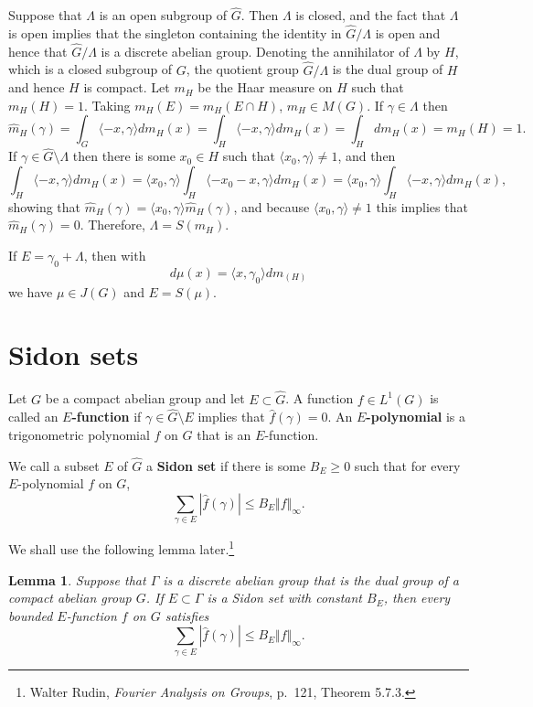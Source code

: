 \documentclass{article}
\newcommand{\inner}[2]{\langle #1, #2 \rangle}
\newcommand{\norm}[1]{\Vert #1 \Vert}
\newtheorem{lemma}[theorem]{Lemma}
\begin{document}
Suppose that $\Lambda$ is an open subgroup of $\widehat{G}$. Then $\Lambda$ is closed,  and
the fact that $\Lambda$ is open implies that the singleton containing the identity in $\widehat{G}/\Lambda$ is open and hence that
$\widehat{G}/\Lambda$ is a discrete abelian group. 
Denoting the annihilator of $\Lambda$ by $H$, which is a closed subgroup of $G$, 
the quotient group $\widehat{G}/\Lambda$ is the dual group of $H$ and hence $H$ is compact. 
Let $m_H$ be the Haar measure on $H$ such that $m_H(H)=1$. Taking $m_H(E) = m_H(E \cap H)$, $m_H \in M(G)$.
 If $\gamma \in \Lambda$ then
\[
\hat{m}_H(\gamma) = \int_G \inner{-x}{\gamma} dm_H(x) = \int_H \inner{-x}{\gamma} dm_H(x) = \int_H dm_H(x) = m_H(H)=1.
\]
If $\gamma \in \widehat{G} \setminus \Lambda$ then there is some $x_0 \in H$ such that $\inner{x_0}{\gamma} \neq 1$,
and then
\[
\int_H \inner{-x}{\gamma} dm_H(x) = \inner{x_0}{\gamma} \int_H \inner{-x_0-x}{\gamma} dm_H(x) = \inner{x_0}{\gamma} \int_H \inner{-x}{\gamma} dm_H(x),
\]
showing that $\hat{m}_H(\gamma) = \inner{x_0}{\gamma} \hat{m}_H(\gamma)$, and because $\inner{x_0}{\gamma} \neq 1$ this implies that $\hat{m}_H(\gamma)=0$.
Therefore, $\Lambda = S(m_H)$. 

If $E=\gamma_0+\Lambda$, then with 
\[
d\mu(x)=\inner{x}{\gamma_0}dm_(H)
\]
we have $\mu \in J(G)$ and $E=S(\mu)$. 


\section{Sidon sets}
Let $G$ be a compact abelian group and let $E \subset \widehat{G}$. A function $f \in L^1(G)$ is called an \textbf{$E$-function} if
$\gamma \in \widehat{G} \setminus E$ implies that $\hat{f}(\gamma)=0$. An \textbf{$E$-polynomial} is a trigonometric polynomial
$f$ on $G$ that is an $E$-function.

We call a subset $E$ of $\widehat{G}$ a \textbf{Sidon set} if there is some $B_E \geq 0$ such that
for every $E$-polynomial $f$ on $G$,
\[
\sum_{\gamma \in E} |\hat{f}(\gamma)| \leq B_E \norm{f}_\infty. 
\]

We shall use the following lemma later.\footnote{Walter
Rudin, {\em Fourier Analysis on Groups}, p.~121, Theorem 5.7.3.}

\begin{lemma}
Suppose that $\Gamma$ is a discrete abelian group that is the dual group of a compact abelian group $G$. If $E \subset \Gamma$ is a Sidon set with constant
$B_E$, then  every bounded $E$-function $f$ on $G$ satisfies
\[
\sum_{\gamma \in E} |\hat{f}(\gamma)| \leq B_E \norm{f}_\infty.
\]
\label{sidon}
\end{lemma}
\end{document}
